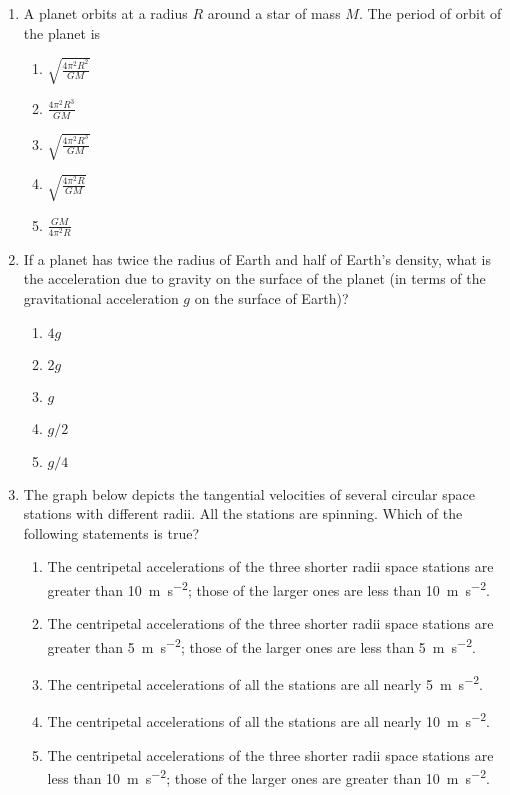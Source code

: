 \documentclass{../../../oss-classkick}
\begin{document}
\begin{multicols}{2}
\begin{enumerate}[leftmargin=18pt,resume]
  \item A planet orbits at a radius $R$ around a star of mass $M$. The period of
    orbit of the planet is
    \begin{enumerate}[nosep,leftmargin=18pt,label=(\Alph*)]
    \item $\displaystyle\sqrt{\frac{4\pi^2R^2}{GM}}$
    \item $\displaystyle\frac{4\pi^2R^3}{GM}$
    \item $\displaystyle\sqrt{\frac{4\pi^2R^3}{GM}}$
    \item $\displaystyle\sqrt{\frac{4\pi^2R}{GM}}$
    \item $\displaystyle\frac{GM}{4\pi^2R}$
    \end{enumerate}
    \columnbreak
    
  \item If a planet has twice the radius of Earth and half of Earth's density,
    what is the acceleration due to gravity on the surface of the planet (in
    terms of the gravitational acceleration $g$ on the surface of Earth)?
    \begin{enumerate}[nosep,leftmargin=18pt,label=(\Alph*)]
    \item $4g$
    \item $2g$
    \item $g$
    \item $g/2$
    \item $g/4$
    \end{enumerate}

  \item The graph below depicts the tangential velocities of several circular
    space stations with different radii. All the stations are spinning. Which
    of the following statements is true?
    \begin{enumerate}[nosep,leftmargin=18pt,label=(\Alph*)]
    \item The centripetal accelerations of the three shorter radii space
      stations are greater than \SI{10}{\metre\per\second\squared}; those of
      the larger ones are less than \SI{10}{\metre\per\second\squared}.
    \item  The centripetal accelerations of the three shorter radii space
      stations are greater than \SI{5}{\metre\per\second\squared}; those of
      the larger ones are less than \SI{5}{\metre\per\second\squared}.
    \item The centripetal accelerations of all the stations are all nearly
      \SI{5}{\metre\per\second\squared}.
    \item The centripetal accelerations of all the stations are all nearly
      \SI{10}{\metre\per\second\squared}.
    \item The centripetal accelerations of the three shorter radii space
      stations are less than \SI{10}{\metre\per\second\squared}; those of the
      larger ones are greater than \SI{10}{\metre\per\second\squared}.
    \end{enumerate}
  \end{enumerate}
\end{multicols}
\newpage
\end{document}
